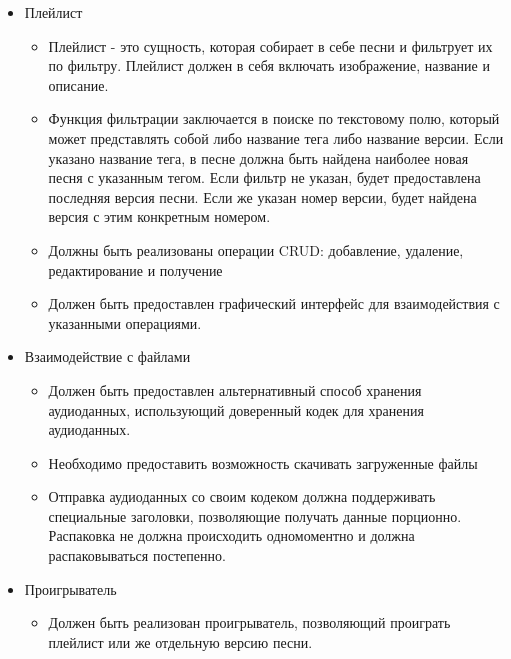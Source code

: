 \documentclass[14pt]{extarticle}
\begin{document}
\begin{itemize}
\begin{itemize}
		\item Должен быть доступен чат внутри каждой из песен, где пользователи могут просматривать а также отправлять свои собственные сообщения
		\item Должна быть реализована возможность просмотра конкретной версии песни.
		\item Должны быть реализованы операции в API для выполнения вышеобозначенных операций.
		\item Необходимо предоставить графический интерфейс для работы с указанными операциями.
	\end{itemize}
	\item Плейлист
	\begin{itemize}
		\item Плейлист - это сущность, которая собирает в себе песни и фильтрует их по фильтру. Плейлист должен в себя включать изображение, название и описание.
		\item Функция фильтрации заключается в поиске по текстовому полю, который может представлять собой либо название тега либо название версии. Если указано название тега, в песне должна быть найдена наиболее новая песня с указанным тегом. Если фильтр не указан, будет предоставлена последняя версия песни. Если же указан номер версии, будет найдена версия с этим конкретным номером.
		\item Должны быть реализованы операции CRUD: добавление, удаление, редактирование и получение
		\item Должен быть предоставлен графический интерфейс для взаимодействия с указанными операциями.
	\end{itemize}
	\item Взаимодействие с файлами
	\begin{itemize}
		\item Должен быть предоставлен альтернативный способ хранения аудиоданных, использующий доверенный кодек для хранения аудиоданных.
		\item Необходимо предоставить возможность скачивать загруженные файлы
		\item Отправка аудиоданных со своим кодеком должна поддерживать специальные заголовки, позволяющие получать данные порционно. Распаковка не должна происходить одномоментно и должна распаковываться постепенно.
	\end{itemize}
	\item Проигрыватель
	\begin{itemize}
		\item Должен быть реализован проигрыватель, позволяющий проиграть плейлист или же отдельную версию песни.

\end{itemize}
\end{itemize}
\end{document}

